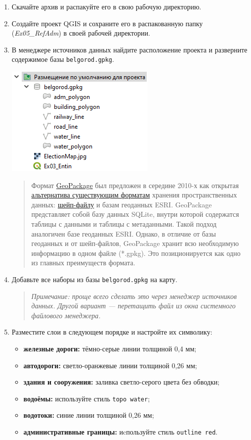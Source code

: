 \documentclass[
  12pt,
]{book}
\providecommand{\tightlist}{%
  \setlength{\itemsep}{0pt}\setlength{\parskip}{0pt}}
\begin{document}
\begin{enumerate}
\def\labelenumi{\arabic{enumi}.}
\item
  Скачайте архив и распакуйте его в свою рабочую директорию.
\item
  Создайте проект QGIS и сохраните его в распакованную папку (\emph{Ex05\_RefAdm}) в своей рабочей директории.
\item
  В менеджере источников данных найдите расположение проекта и разверните содержимое базы \texttt{belgorod.gpkg}.

  \includegraphics{images/Ex05/GeoPackage_structure.png}

  \begin{quote}
  Формат \href{http://www.geopackage.org/}{GeoPackage} был предложен в середине 2010-х как открытая \href{https://imgs.xkcd.com/comics/standards.png}{альтернатива существующим форматам} хранения пространственных данных: \href{http://switchfromshapefile.org/\#shapefileisbad}{шейп-файлу} и базам геоданных ESRI. GeoPackage представляет собой базу данных SQLite, внутри которой содержатся таблицы с данными и таблицы с метаданными. Такой подход аналогичен базе геоданных ESRI. Однако, в отличие от базы геоданных и от шейп-файлов, GeoPackage хранит всю необходимую информацию в одном файле (*.gpkg). Это позиционируется как одно из главных преимуществ формата.
  \end{quote}
\item
  Добавьте все наборы из базы \texttt{belgorod.gpkg} на карту.

  \begin{quote}
  \emph{Примечание: проще всего сделать это через менеджер источников данных. Другой вариант --- перетащить файл из окна системного файлового менеджера.}
  \end{quote}
\item
  Разместите слои в следующем порядке и настройте их символику:

  \begin{itemize}
  \tightlist
  \item
    \textbf{железные дороги:} тёмно-серые линии толщиной 0,4 мм;
  \item
    \textbf{автодороги:} светло-оранжевые линии толщиной 0,26 мм;
  \item
    \textbf{здания и сооружения:} заливка светло-серого цвета без обводки;
  \item
    \textbf{водоёмы:} используйте стиль \texttt{topo\ water};
  \item
    \textbf{водотоки:} синие линии толщиной 0,26 мм;
  \item
    \textbf{административные границы:} иcпользуйте стиль \texttt{outline\ red}.
  \end{itemize}


\end{enumerate}
\end{document}
